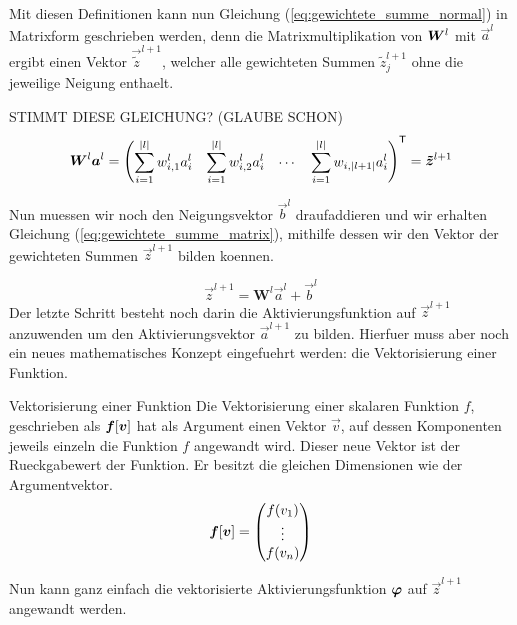 \para{}
Mit diesen Definitionen kann nun Gleichung (\ref{eq:gewichtete_summe_normal}) in
Matrixform geschrieben werden, denn die Matrixmultiplikation von $\bm{W}^l$ mit
$\vec{a}^{l}$ ergibt einen Vektor $\vec{\tilde{z}}^{l+1}$, welcher alle gewichteten
Summen $\tilde{z}_j^{l+1}$ ohne die jeweilige Neigung enthaelt.

STIMMT DIESE GLEICHUNG? (GLAUBE SCHON)
\begin{equation*}
  \bm{W}^l \bm{a}^{l} = \begin{pmatrix}\displaystyle \sum_{i=1}^{|l|} w_{i,1}^l a_i^l &\displaystyle \sum_{i=1}^{|l|} w_{i,2}^l a_i^l & \cdots &\displaystyle \sum_{i=1}^{|l|} w_{i,|l+1|} a_i^l \end{pmatrix}^{\mathsf{T}} = \bm{\tilde{z}}^{l+1}
\end{equation*}
\para{}

Nun muessen wir noch den Neigungsvektor $\vec{b}^l$ draufaddieren und wir
erhalten Gleichung (\ref{eq:gewichtete_summe_matrix}), mithilfe dessen wir den
Vektor der gewichteten Summen $\vec{z}^{l+1}$ bilden koennen.

\begin{equation}\label{eq:gewichtete_summe_matrix}
  \vec{z}^{l+1} = \mathbf{W}^{l} \vec{a}^{l} + \vec{b}^{l}
\end{equation}
\para{}
Der letzte Schritt besteht noch darin die Aktivierungsfunktion auf $\vec{z}^{l+1}$
anzuwenden um den Aktivierungsvektor $\vec{a}^{l+1}$ zu bilden.
Hierfuer muss aber noch ein neues mathematisches
Konzept eingefuehrt werden: die Vektorisierung einer Funktion.
\para{}

\begin{defbox}{Vektorisierung einer Funktion}
  Die Vektorisierung einer skalaren Funktion $f$, geschrieben als
  $\bm{f}[\bm{v}]$ hat als Argument einen Vektor $\vec{v}$, auf dessen
  Komponenten jeweils einzeln die Funktion $f$ angewandt wird. Dieser neue
  Vektor ist der Rueckgabewert der Funktion. Er besitzt die gleichen Dimensionen
  wie der Argumentvektor.
  \begin{equation*}
    \bm{f}[\bm{v}]=
    \begin{pmatrix}
      f(v_1)\\
      \vdots \\
      f(v_n)\\
    \end{pmatrix}
  \end{equation*}
\end{defbox}
\para{}

Nun kann ganz einfach die vektorisierte Aktivierungsfunktion $\bm{\varphi}$ auf
$\vec{z}^{l+1}$ angewandt werden.

